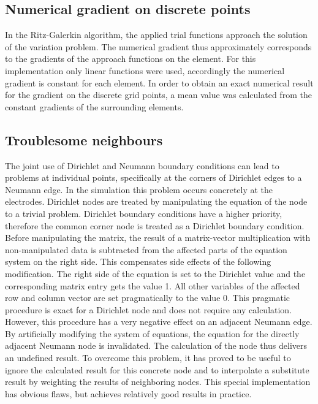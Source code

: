 \documentclass[parskip=half, titlepage=yes, 12pt, BCOR=12mm, DIV=calc]{scrartcl}
\begin{document}
\subsection{Numerical gradient on discrete points}
In the Ritz-Galerkin algorithm, the applied trial functions approach the solution of the variation problem. The numerical gradient thus approximately corresponds to the gradients of the approach functions on the element. For this implementation only linear functions were used, accordingly the numerical gradient is constant for each element. In order to obtain an exact numerical result for the gradient on the discrete grid points, a mean value was calculated from the constant gradients of the surrounding elements.


\subsection{Troublesome neighbours}
The joint use of Dirichlet and Neumann boundary conditions can lead to problems at individual points, specifically at the corners of Dirichlet edges to a Neumann edge. In the simulation this problem occurs concretely at the electrodes. Dirichlet nodes are treated by manipulating the equation of the node to a trivial problem. Dirichlet boundary conditions have a higher priority, therefore the common corner node is treated as a Dirichlet boundary condition. Before manipulating the matrix, the result of a matrix-vector multiplication with non-manipulated data is subtracted from the affected parts of the equation system on the right side. This compensates side effects of the following modification. The right side of the equation is set to the Dirichlet value and the corresponding matrix entry gets the value 1. All other variables of the affected row and column vector are set pragmatically to the value 0. This pragmatic procedure is exact for a Dirichlet node and does not require any calculation. However, this procedure has a very negative effect on an adjacent Neumann edge. By artificially modifying the system of equations, the equation for the directly adjacent Neumann node is invalidated. The calculation of the node thus delivers an undefined result. To overcome this problem, it has proved to be useful to ignore the calculated result for this concrete node and to interpolate a substitute result by weighting the results of neighboring nodes. This special implementation has obvious flaws, but achieves relatively good results in practice.
\end{document}
